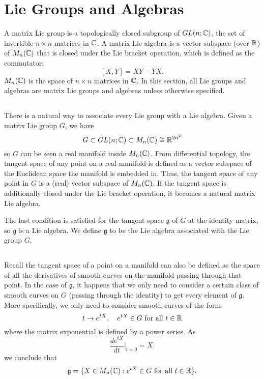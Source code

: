 \section{Lie Groups and Algebras}
A matrix Lie group is a topologically closed subgroup of $GL(n; {\mathbb C})$, the set of invertible $n \times n$ matrices in ${\mathbb C}$. A matrix Lie algebra is a vector subspace (over ${\mathbb R}$) of $M_n({\mathbb C})$ that is closed under the Lie bracket operation, which is defined as the commutator:
\[
    [X, Y] = XY - YX.
\]
$M_n({\mathbb C})$ is the space of $n \times n$ matrices in ${\mathbb C}$. In this section, all Lie groups and algebras are matrix Lie groups and algebras unless otherwise specified.

\subsection{}
There is a natural way to associate every Lie group with a Lie algebra. Given a matrix Lie group $G$, we have
\[
    G \subset GL(n; {\mathbb C}) \subset M_n({\mathbb C}) \cong {\mathbb R}^{2n^2}
\]
so $G$ can be seen a real manifold inside $M_n({\mathbb C})$. From differential topology, the tangent space of any point on a real manifold is defined as a vector subspace of the Euclidean space the manifold is embedded in. Thus, the tangent space of any point in $G$ is a (real) vector subspace of $M_n({\mathbb C})$. If the tangent space is additionally closed under the Lie bracket operation, it becomes a natural matrix Lie algebra.

The last condition is satisfied for the tangent space $\mathfrak g$ of $G$ at the identity matrix, so $\mathfrak g$ is a Lie algebra. We define $\mathfrak g$ to be the Lie algebra associated with the Lie group $G$.

\subsection{}
Recall the tangent space of a point on a manifold can also be defined as the space of all the derivatives of smooth curves on the manifold passing through that point. In the case of $\mathfrak g$, it happens that we only need to consider a certain class of smooth curves on $G$ (passing through the identity) to get every element of $\mathfrak g$. More specifically, we only need to consider smooth curves of the form
\[
    t \rightarrow e^{tX}, \quad e^{tX} \in G \text{ for all } t \in {\mathbb R}
\]
where the matrix exponential is defined by a power series. As
\[
    \frac{d e^{tX}}{dt} \Bigr|_{t = 0} = X.
\]
we conclude that
\[
    \mathfrak g = \{X \in M_n({\mathbb C}) : e^{tX} \in G \text{ for all } t \in {\mathbb R}\}.
\]

